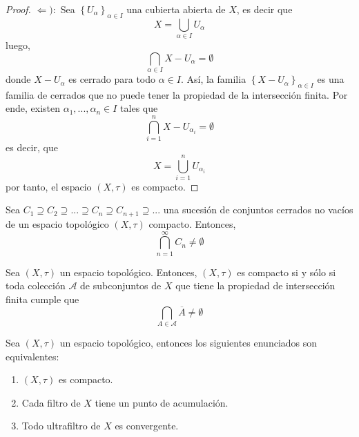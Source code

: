 \documentclass[12pt]{report}
\theoremstyle{largebreak}
\newcommand{\Cls}[1]{\ensuremath{\overline{#1}}}
\begin{document}
\begin{proof}
        $\Leftarrow):$ Sea $\left\{U_\alpha \right\}_{\alpha\in I}$ una cubierta abierta de $X$, es decir que
        \begin{equation*}
            X=\bigcup_{\alpha\in I}U_\alpha
        \end{equation*}
        luego,
        \begin{equation*}
            \bigcap_{\alpha\in I}X-U_\alpha=\emptyset
        \end{equation*}
        donde $X-U_\alpha$ es cerrado para todo $\alpha\in I$. Así, la familia $\left\{X-U_\alpha\right\}_{\alpha\in I}$ es una familia de cerrados que no puede tener la propiedad de la intersección finita. Por ende, existen $\alpha_1,...,\alpha_n\in I$ tales que
        \begin{equation*}
            \bigcap_{ i=1}^n X-U_{\alpha_i}=\emptyset
        \end{equation*}
        es decir, que
        \begin{equation*}
            X=\bigcup_{i=1}^n U_{\alpha_i}
        \end{equation*}
        por tanto, el espacio $(X,\tau)$ es compacto.
    \end{proof}

    \begin{cor}
        Sea $C_1\supseteq C_2\supseteq...\supseteq C_n\supseteq C_{ n+1}\supseteq ...$ una sucesión de conjuntos cerrados no vacíos de un espacio topológico $(X,\tau)$ compacto. Entonces,
        \begin{equation*}
            \bigcap_{ n=1}^\infty C_n\neq\emptyset
        \end{equation*}
    \end{cor}

    \begin{cor}
        Sea $(X,\tau)$ un espacio topológico. Entonces, $(X,\tau)$ es compacto si y sólo si toda colección $\mathcal{A}$ de subconjuntos de $X$ que tiene la propiedad de intersección finita cumple que
        \begin{equation*}
            \bigcap_{ A\in\mathcal{A}}\Cls{A}\neq\emptyset
        \end{equation*}
    \end{cor}

    \begin{propo}
        Sea $(X,\tau)$ un espacio topológico, entonces los siguientes enunciados son equivalentes:
        \begin{enumerate}
            \item $(X,\tau)$ es compacto.
            \item Cada filtro de $X$ tiene un punto de acumulación.
            \item Todo ultrafiltro de $X$ es convergente.
        \end{enumerate}
    \end{propo}
\end{document}
